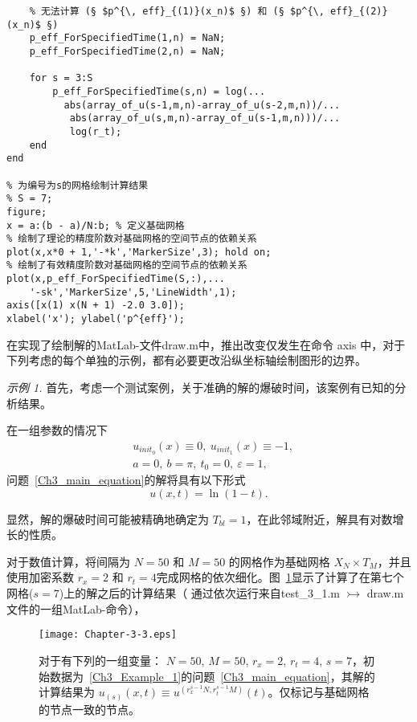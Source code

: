\documentclass[twoside]{book}
\begin{document}
\begin{CJK*}{GBK}{song}
\begin{lstlisting}
    % 无法计算 (§ $p^{\, eff}_{(1)}(x_n)$ §) 和 (§ $p^{\, eff}_{(2)}(x_n)$ §)
    p_eff_ForSpecifiedTime(1,n) = NaN;
    p_eff_ForSpecifiedTime(2,n) = NaN;

    for s = 3:S
        p_eff_ForSpecifiedTime(s,n) = log(...
          abs(array_of_u(s-1,m,n)-array_of_u(s-2,m,n))/...
           abs(array_of_u(s,m,n)-array_of_u(s-1,m,n)))/...
           log(r_t);
    end
end

% 为编号为s的网格绘制计算结果
% S = 7;
figure;
x = a:(b - a)/N:b; % 定义基础网格
% 绘制了理论的精度阶数对基础网格的空间节点的依赖关系
plot(x,x*0 + 1,'-*k','MarkerSize',3); hold on;
% 绘制了有效精度阶数对基础网格的空间节点的依赖关系
plot(x,p_eff_ForSpecifiedTime(S,:),...
    '-sk','MarkerSize',5,'LineWidth',1);
axis([x(1) x(N + 1) -2.0 3.0]);
xlabel('x'); ylabel('p^{eff}');
\end{lstlisting}


在实现了绘制解的MatLab-文件draw.m中，推出改变仅发生在命令 axis 中，对于下列考虑的每个单独的示例，都有必要更改沿纵坐标轴绘制图形的边界。

\emph{示例 1.} 首先，考虑一个测试案例，关于准确的解的爆破时间，该案例有已知的分析结果。

在一组参数的情况下
\begin{equation}
    \label{Ch3_Example_1}
    \begin{aligned}
        &u_{init_0}(x)  \equiv 0, \: u_{init_1}(x)  \equiv -1, \\
        &a = 0, \: b = \pi, \: t_0 = 0, \: \varepsilon = 1,
    \end{aligned}
\end{equation}
问题~\eqref{Ch3_main_equation}的解将具有以下形式
\begin{equation}
    \label{Ch3_Example_1_model_solution}
    u(x,t) = \ln(1 - t).
\end{equation}

显然，解的爆破时间可能被精确地确定为 $T_{bl}= 1$，在此邻域附近，解具有对数增长的性质。

对于数值计算，将间隔为 $N = 50$ 和 $M = 50$ 的网格作为基础网格 $X_N \times T_M$，并且使用加密系数 $r_x = 2$ 和 $r_t = 4$完成网格的依次细化。图~\ref{Fig_3_3}显示了计算了在第七个网格($s = 7$)上的解之后的计算结果（ 通过依次运行来自test\_3\_1.m $\rightarrowtail$ draw.m文件的一组MatLab-命令），
\begin{figure}[t]
    \centering
    \texttt{[image: Chapter-3-3.eps]}\\
    \caption{对于有下列的一组变量： $N = 50$, $M = 50$, $r_x = 2$, $r_t = 4$, $s = 7$，初始数据为~\eqref{Ch3_Example_1}的问题~\eqref{Ch3_main_equation}，其解的计算结果为 $u_{(s)}(x,t) \equiv u^{(r_x^{s - 1}N,r_t^{s - 1}M)}(t)$。仅标记与基础网格的节点一致的节点。}
    \label{Fig_3_3}
\end{figure}


\end{CJK*}
\end{document}
